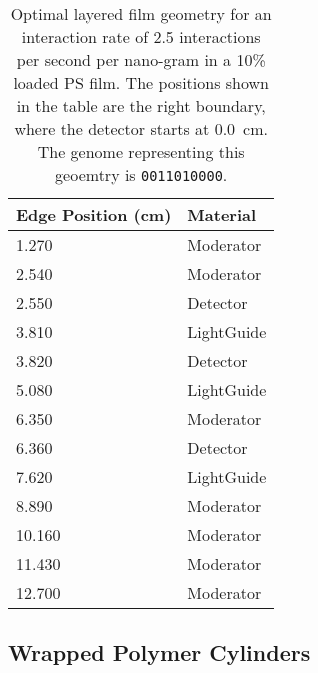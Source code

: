 \begin{table}
	\caption[Optimal Layered Film Geometry for 2.5 interaction per second per nanogram Cf-252]{Optimal layered film geometry for an interaction rate of 2.5 interactions per second per nano-gram  in a 10\%  loaded PS film. The positions shown in the table are the right boundary, where the detector starts at \SI{0.0}{\cm}. The genome representing this geoemtry is \texttt{0011010000}.}
	\label{tab:OptGeoDetailed25}
	\begin{tabular}{m{3cm} m{4cm}}
	\toprule
	Edge Position (\si{\cm}) & Material \\
	\midrule
1.270&Moderator\\
2.540&Moderator\\
2.550&Detector\\
3.810&LightGuide\\
3.820&Detector\\
5.080&LightGuide\\
6.350&Moderator\\
6.360&Detector\\
7.620&LightGuide\\
8.890&Moderator\\
10.160&Moderator\\
11.430&Moderator\\
12.700&Moderator\\
	\bottomrule
	\end{tabular}
\end{table}

\subsection{Wrapped Polymer Cylinders}
\label{sec:WrappedCylinders}

